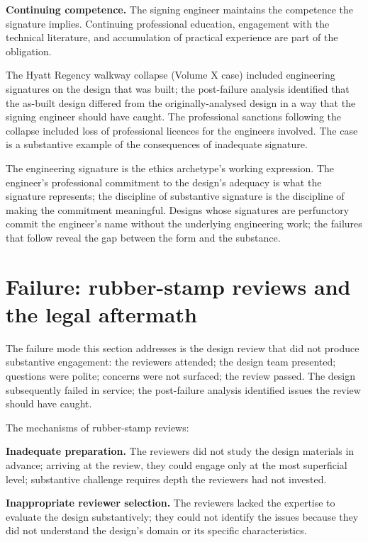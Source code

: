 \textbf{Continuing competence.} The signing engineer maintains the competence the signature implies. Continuing professional education, engagement with the technical literature, and accumulation of practical experience are part of the obligation.

The Hyatt Regency walkway collapse (Volume X case) included engineering signatures on the design that was built; the post-failure analysis identified that the as-built design differed from the originally-analysed design in a way that the signing engineer should have caught. The professional sanctions following the collapse included loss of professional licences for the engineers involved. The case is a substantive example of the consequences of inadequate signature.

\begin{archetype}[ethics]
The engineering signature is the ethics archetype's working expression. The engineer's professional commitment to the design's adequacy is what the signature represents; the discipline of substantive signature is the discipline of making the commitment meaningful. Designs whose signatures are perfunctory commit the engineer's name without the underlying engineering work; the failures that follow reveal the gap between the form and the substance.
\end{archetype}

\section{Failure: rubber-stamp reviews and the legal aftermath}

The failure mode this section addresses is the design review that did not produce substantive engagement: the reviewers attended; the design team presented; questions were polite; concerns were not surfaced; the review passed. The design subsequently failed in service; the post-failure analysis identified issues the review should have caught.

The mechanisms of rubber-stamp reviews:

\textbf{Inadequate preparation.} The reviewers did not study the design materials in advance; arriving at the review, they could engage only at the most superficial level; substantive challenge requires depth the reviewers had not invested.

\textbf{Inappropriate reviewer selection.} The reviewers lacked the expertise to evaluate the design substantively; they could not identify the issues because they did not understand the design's domain or its specific characteristics.

